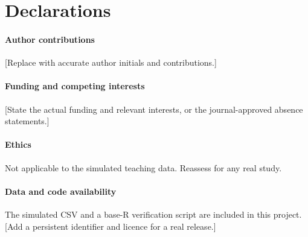 \section*{Declarations}

\paragraph{Author contributions}
[Replace with accurate author initials and contributions.]

\paragraph{Funding and competing interests}
[State the actual funding and relevant interests, or the journal-approved
absence statements.]

\paragraph{Ethics}
Not applicable to the simulated teaching data. Reassess for any real study.

\paragraph{Data and code availability}
The simulated CSV and a base-R verification script are included in this
project. [Add a persistent identifier and licence for a real release.]
